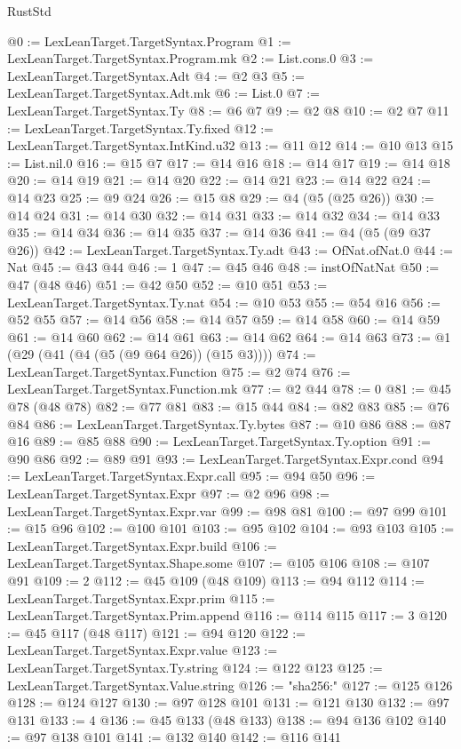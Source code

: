 \begin{lexlean}{RustStd}
\begin{coremodule}
@0 := LexLeanTarget.TargetSyntax.Program
@1 := LexLeanTarget.TargetSyntax.Program.mk
@2 := List.cons.{0}
@3 := LexLeanTarget.TargetSyntax.Adt
@4 := @2 @3
@5 := LexLeanTarget.TargetSyntax.Adt.mk
@6 := List.{0}
@7 := LexLeanTarget.TargetSyntax.Ty
@8 := @6 @7
@9 := @2 @8
@10 := @2 @7
@11 := LexLeanTarget.TargetSyntax.Ty.fixed
@12 := LexLeanTarget.TargetSyntax.IntKind.u32
@13 := @11 @12
@14 := @10 @13
@15 := List.nil.{0}
@16 := @15 @7
@17 := @14 @16
@18 := @14 @17
@19 := @14 @18
@20 := @14 @19
@21 := @14 @20
@22 := @14 @21
@23 := @14 @22
@24 := @14 @23
@25 := @9 @24
@26 := @15 @8
@29 := @4 (@5 (@25 @26))
@30 := @14 @24
@31 := @14 @30
@32 := @14 @31
@33 := @14 @32
@34 := @14 @33
@35 := @14 @34
@36 := @14 @35
@37 := @14 @36
@41 := @4 (@5 (@9 @37 @26))
@42 := LexLeanTarget.TargetSyntax.Ty.adt
@43 := OfNat.ofNat.{0}
@44 := Nat
@45 := @43 @44
@46 := 1
@47 := @45 @46
@48 := instOfNatNat
@50 := @47 (@48 @46)
@51 := @42 @50
@52 := @10 @51
@53 := LexLeanTarget.TargetSyntax.Ty.nat
@54 := @10 @53
@55 := @54 @16
@56 := @52 @55
@57 := @14 @56
@58 := @14 @57
@59 := @14 @58
@60 := @14 @59
@61 := @14 @60
@62 := @14 @61
@63 := @14 @62
@64 := @14 @63
@73 := @1 (@29 (@41 (@4 (@5 (@9 @64 @26)) (@15 @3))))
@74 := LexLeanTarget.TargetSyntax.Function
@75 := @2 @74
@76 := LexLeanTarget.TargetSyntax.Function.mk
@77 := @2 @44
@78 := 0
@81 := @45 @78 (@48 @78)
@82 := @77 @81
@83 := @15 @44
@84 := @82 @83
@85 := @76 @84
@86 := LexLeanTarget.TargetSyntax.Ty.bytes
@87 := @10 @86
@88 := @87 @16
@89 := @85 @88
@90 := LexLeanTarget.TargetSyntax.Ty.option
@91 := @90 @86
@92 := @89 @91
@93 := LexLeanTarget.TargetSyntax.Expr.cond
@94 := LexLeanTarget.TargetSyntax.Expr.call
@95 := @94 @50
@96 := LexLeanTarget.TargetSyntax.Expr
@97 := @2 @96
@98 := LexLeanTarget.TargetSyntax.Expr.var
@99 := @98 @81
@100 := @97 @99
@101 := @15 @96
@102 := @100 @101
@103 := @95 @102
@104 := @93 @103
@105 := LexLeanTarget.TargetSyntax.Expr.build
@106 := LexLeanTarget.TargetSyntax.Shape.some
@107 := @105 @106
@108 := @107 @91
@109 := 2
@112 := @45 @109 (@48 @109)
@113 := @94 @112
@114 := LexLeanTarget.TargetSyntax.Expr.prim
@115 := LexLeanTarget.TargetSyntax.Prim.append
@116 := @114 @115
@117 := 3
@120 := @45 @117 (@48 @117)
@121 := @94 @120
@122 := LexLeanTarget.TargetSyntax.Expr.value
@123 := LexLeanTarget.TargetSyntax.Ty.string
@124 := @122 @123
@125 := LexLeanTarget.TargetSyntax.Value.string
@126 := "sha256:"
@127 := @125 @126
@128 := @124 @127
@130 := @97 @128 @101
@131 := @121 @130
@132 := @97 @131
@133 := 4
@136 := @45 @133 (@48 @133)
@138 := @94 @136 @102
@140 := @97 @138 @101
@141 := @132 @140
@142 := @116 @141

\end{coremodule}
\end{lexlean}
